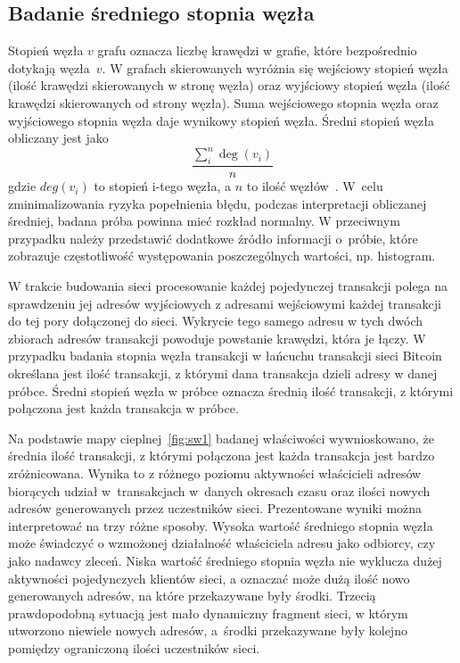 \documentclass[12pt, oneside, final, openany]{mgr}
\begin{document}
\subsection{Badanie średniego stopnia węzła}
\label{stopien_wezla}
\indent Stopień węzła $v$ grafu oznacza liczbę krawędzi w grafie, które bezpośrednio dotykają węzła~$v$. W grafach skierowanych wyróżnia się wejściowy stopień węzła (ilość krawędzi skierowanych w stronę węzła) oraz wyjściowy stopień węzła (ilość krawędzi skierowanych od strony węzła). Suma wejściowego stopnia węzła oraz wyjściowego stopnia węzła daje wynikowy stopień węzła. Średni stopień węzła obliczany jest jako 
\begin{equation}
\label{eq:stopien_wezla}
  \frac{\sum_i^n\deg(v_i)}{n}
\end{equation} 
gdzie $deg(v_i)$ to stopień i-tego węzła, a $n$ to ilość węzłów~\cite{barabasi2016network}. W~celu zminimalizowania ryzyka popełnienia błędu, podczas interpretacji obliczanej średniej, badana próba powinna mieć rozkład normalny. W przeciwnym przypadku należy przedstawić dodatkowe źródło informacji o~próbie, które zobrazuje częstotliwość występowania poszczególnych wartości, np. histogram. 

\indent W trakcie budowania sieci procesowanie każdej pojedynczej transakcji polega na sprawdzeniu jej adresów wyjściowych z adresami wejściowymi każdej transakcji do tej pory dołączonej do sieci. Wykrycie tego samego adresu w tych dwóch zbiorach adresów transakcji powoduje powstanie krawędzi, która je łączy. W przypadku badania stopnia węzła transakcji w łańcuchu transakcji sieci Bitcoin określana jest ilość transakcji, z którymi dana transakcja dzieli adresy w danej próbce. Średni stopień węzła w próbce oznacza średnią ilość transakcji, z którymi połączona jest każda transakcja w próbce. 

\indent Na podstawie mapy cieplnej~\ref{fig:sw1} badanej właściwości wywnioskowano, że średnia ilość transakcji, z którymi połączona jest każda transakcja jest bardzo zróżnicowana. Wynika to z różnego poziomu aktywności właścicieli adresów biorących udział w~transakcjach w~danych okresach czasu oraz ilości nowych adresów generowanych przez uczestników sieci. Prezentowane wyniki można interpretować na trzy różne sposoby. Wysoka wartość średniego stopnia węzła może świadczyć o wzmożonej działalność właściciela adresu jako odbiorcy, czy jako nadawcy zleceń. Niska wartość średniego stopnia węzła nie wyklucza dużej aktywności pojedynczych klientów sieci, a oznaczać może dużą ilość nowo generowanych adresów, na które przekazywane były środki. Trzecią prawdopodobną sytuacją jest mało dynamiczny fragment sieci, w którym utworzono niewiele nowych adresów, a~środki przekazywane były kolejno pomiędzy ograniczoną ilości uczestników sieci.
\end{document}
